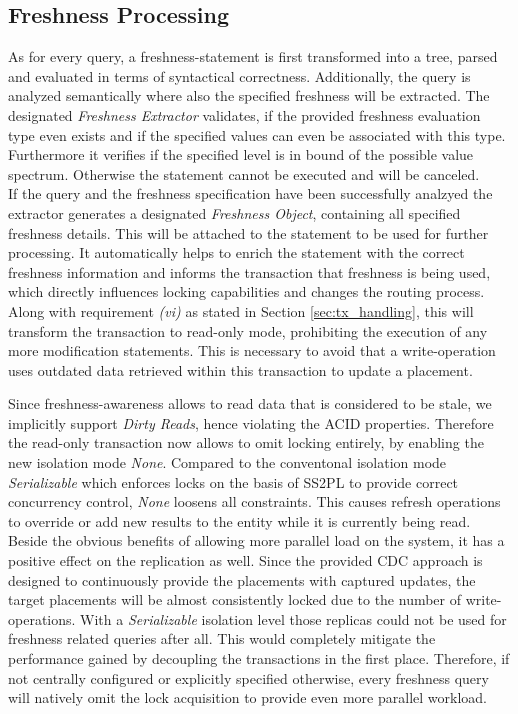 
\subsection{Freshness Processing}
\label{sec:fresh_proc}

As for every query, a freshness-statement is first transformed into a tree, parsed and evaluated in terms of syntactical correctness. 
Additionally, the query is analyzed semantically where also the specified freshness will be extracted. The designated \textit{Freshness Extractor} 
validates, if the provided freshness evaluation type even exists and if the specified values can even be associated with this type.
Furthermore it verifies if the specified level is in bound of the possible value spectrum. 
Otherwise the statement cannot be executed and will be canceled.\\
If the query and the freshness specification have been successfully analzyed the extractor generates a designated \textit{Freshness Object}, 
containing all specified freshness details. This will be attached to the statement to be used for further processing.
It automatically helps to enrich the statement with the correct freshness information and informs the transaction that freshness is being used,
which directly influences locking capabilities and changes the routing process. 
Along with requirement \textit{(vi)} as stated in Section \ref{sec:tx_handling}, this will transform the transaction to read-only mode, prohibiting the execution of any more modification
statements. This is necessary to avoid that a write-operation uses outdated data retrieved within this transaction to update a placement.

Since freshness-awareness allows to read data that is considered to be stale, we implicitly support \emph{Dirty Reads}, hence violating the ACID properties.
Therefore the read-only transaction now allows to omit locking entirely, by enabling the new isolation mode \emph{None}. 
Compared to the conventonal isolation mode \emph{Serializable} which enforces locks on the basis of SS2PL to provide correct concurrency control, \emph{None} 
loosens all constraints. This causes refresh operations to override or add new results to the entity while it is currently being read. 
Beside the obvious benefits of allowing more parallel load on the system, it has a positive effect on the replication as well.
Since the provided CDC approach is designed to continuously provide the placements with captured updates, the target placements will be almost consistently locked due 
to the number of write-operations.
With a \emph{Serializable} isolation level those replicas could not be used for freshness related queries after all. 
This would completely mitigate the performance gained by decoupling the transactions in the first place. 
Therefore, if not centrally configured or explicitly specified otherwise, every freshness query will natively omit the lock acquisition to provide even more parallel workload.


